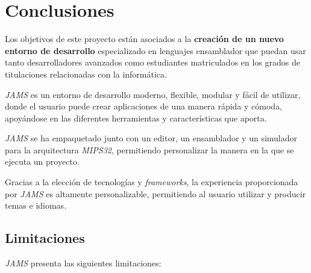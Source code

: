 \chapter{Conclusiones}\label{ch:conclusiones}

Los objetivos de este proyecto están asociados a la \textbf{creación
de un nuevo entorno de desarrollo} especializado en lenguajes
ensamblador que puedan usar tanto desarrolladores avanzados
como estudiantes matriculados en los grados de titulaciones
relacionadas con la informática.

\textit{JAMS} es un entorno de desarrollo moderno,
flexible, modular y fácil de utilizar, donde el usuario puede
crear aplicaciones de una manera rápida y cómoda,
apoyándose en las diferentes herramientas y
características que aporta.

\textit{JAMS} se ha empaquetado junto con un
editor, un ensamblador y un simulador para la arquitectura
\textit{MIPS32}, permitiendo personalizar la manera en la
que se ejecuta un proyecto.

Gracias a la elección de tecnologías y
\textit{frameworks}, la experiencia proporcionada por
\textit{JAMS} es altamente personalizable, permitiendo
al usuario utilizar y producir temas e idiomas.


\section{Limitaciones}\label{sec:limitaciones}

\textit{JAMS} presenta las siguientes limitaciones:

